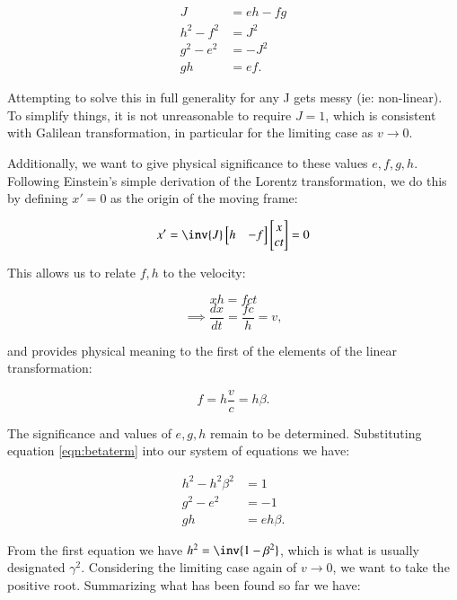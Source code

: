 \documentclass{article}      %
\begin{document}
\begin{align}
J &= eh - fg \\
h^2 - f^2 &= J^2 \\
g^2 - e^2 &= -J^2 \\
g h &= e f.
\end{align}

Attempting to solve this in full generality for any J gets messy (ie: non-linear).
To simplify things, it is not unreasonable to
require $J = 1$, which is consistent with Galilean transformation, in particular for the limiting case as $v \rightarrow 0$.

Additionally, we want to give physical significance to these values $e,f,g,h$.  Following Einstein's simple derivation
of the Lorentz transformation, we do this by defining $x'=0$ as the origin of the moving frame:

\[
x'
=
\inv{J}
\begin{bmatrix}
h & -f \\
\end{bmatrix}
\begin{bmatrix}
x \\
c t \\
\end{bmatrix}
= 0
\]

This allows us to relate $f,h$ to the velocity:

\[
x h = f c t
\]
\[
\implies
\frac{dx}{dt} = \frac{f c}{h} = v,
\]

and provides physical meaning to the first of the elements of the linear transformation:

\begin{equation}\label{eqn:betaterm}
f = h \frac{v}{c} = h \beta.
\end{equation}

The significance and values of $e,g,h$ remain to be determined.  Substituting equation \ref{eqn:betaterm} into our
system of equations we have:

\begin{align*}
h^2 - h^2 \beta^2 &= 1 \\
g^2 - e^2 &= -1 \\
g h &= e h \beta.
\end{align*}

From the first equation we have $h^2 = \inv{1 -\beta^2}$, which is what is usually designated $\gamma^2$.  Considering
the limiting case again of $v \rightarrow 0$, we want to take the positive root.  Summarizing what has been found 
so far we have:
\end{document}
